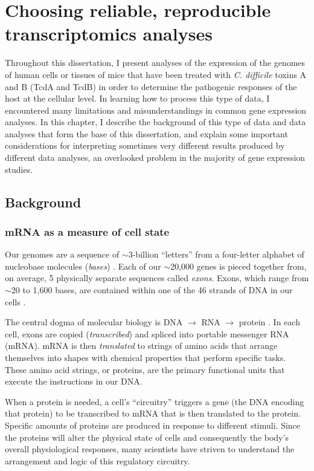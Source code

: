 
\chapter[Choosing transcriptomics analyses]{Choosing reliable, reproducible 
           transcriptomics analyses}\label{chapter:intro3}

Throughout this dissertation, I present analyses of the expression of the genomes
of human cells or tissues of mice that have been treated 
with \textit{C. difficile} toxins A and B
(TcdA and TcdB) in order to determine the pathogenic responses
of the host at the cellular level. 
In learning how to process this type of data,
I encountered many limitations and misunderstandings in 
common gene expression analyses. In this chapter, I describe
the background of this type of data and data analyses that form 
the base of this dissertation, and explain some important considerations
for interpreting sometimes very different results 
produced by different data analyses, an overlooked problem in the
majority of gene expression studies.

\section{Background}

\subsection{mRNA as a measure of cell state}

Our genomes are a sequence of $\sim$3-billion ``letters'' from a four-letter
alphabet of nucleobase molecules (\textit{bases}) \cite{Lander:2001wi}. 
Each of our $\sim$20,000 genes is pieced together from, on average,
5 physically separate sequences called \textit{exons}. Exons, which
range from $\sim$20 to 1,600 bases, are contained
within one of the 46 strands of DNA in our cells \cite{Michael:1999dm}.

The central dogma of molecular biology is 
DNA $\rightarrow$ RNA $\rightarrow$ protein \cite{Crick:1970wb}.
In each cell, exons are
copied (\textit{transcribed}) and spliced into portable
messenger RNA (mRNA). 
mRNA is then \textit{translated} to strings
of amino acids that arrange themselves into shapes with 
chemical properties that perform specific tasks.
These amino acid strings, or proteins, are the primary functional 
units that execute the instructions in our DNA.

When a protein is needed, a cell's ``circuitry'' 
triggers a gene (the DNA encoding that protein)
to be transcribed to mRNA that is then translated to the protein.
Specific amounts of proteins are produced
in response to different stimuli. Since the proteins will alter
the physical state of cells and consequently the body's overall physiological responses, 
many scientists have striven to understand the arrangement and logic
of this regulatory circuitry.

